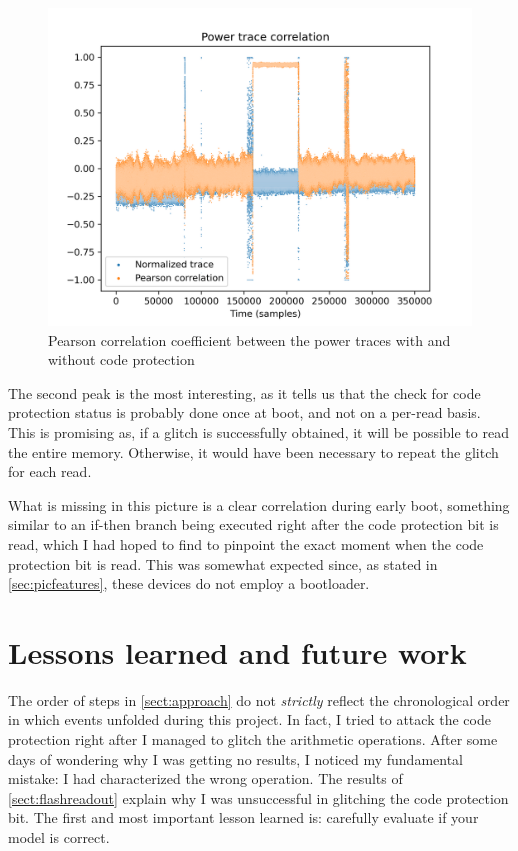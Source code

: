 \documentclass[a4paper,english,twoside,10pt]{article}
\begin{document}
\begin{figure}[htbp]
	\centering%
	\includegraphics[width=.75\textwidth]{seaborn_trace_correlation.png}
	\caption{Pearson correlation coefficient between the power traces with and without code protection}
	\label{fig:trace_corr}
\end{figure}

The second peak is the most interesting, as it tells us that the check for code protection status is probably done once at boot, and not on a per-read basis. This is promising as, if a glitch is successfully obtained, it will be possible to read the entire memory. Otherwise, it would have been necessary to repeat the glitch for each read.

What is missing in this picture is a clear correlation during early boot, something similar to an if-then branch being executed right after the code protection bit is read, which I had hoped to find to pinpoint the exact moment when the code protection bit is read. This was somewhat expected since, as stated in \cref{sec:picfeatures}, these devices do not employ a bootloader.

\section{Lessons learned and future work}
The order of steps in \cref{sect:approach} do not \textit{strictly} reflect the chronological order in which events unfolded during this project. In fact, I tried to attack the code protection right after I managed to glitch the arithmetic operations. After some days of wondering why I was getting no results, I noticed my fundamental mistake: I had characterized the wrong operation. The results of \cref{sect:flashreadout} explain why I was unsuccessful in glitching the code protection bit. The first and most important lesson learned is: carefully evaluate if your model is correct.
\end{document}
